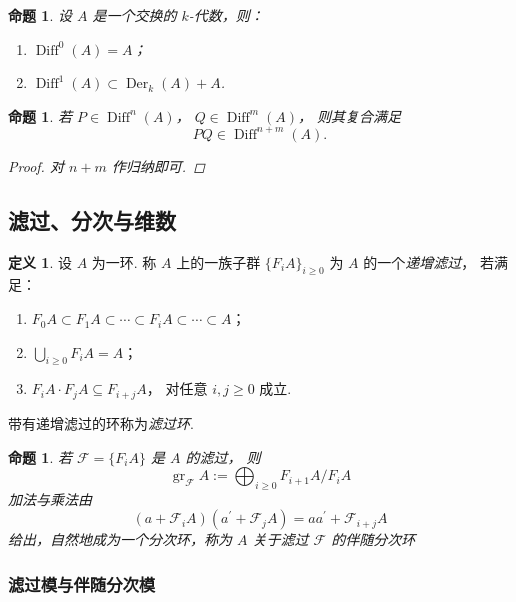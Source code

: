\documentclass[11pt]{article}
\theoremstyle{plain}
\newtheorem{proposition}[theorem]{命题}
\theoremstyle{definition}
\newtheorem{definition}[theorem]{定义}
\theoremstyle{remark}
\newcommand{\gr}{\operatorname{gr}}
\newcommand{\Der}{\operatorname{Der}}
\begin{document}
\begin{proposition}
    设 $A$ 是一个交换的 $k$-代数，则：
    \begin{enumerate}[label=(\arabic*)]
        \item $\operatorname{Diff}^0(A)=A$；
        \item $\operatorname{Diff}^1(A)\subset \Der_k(A)+A$.
    \end{enumerate}
\end{proposition}

\begin{proposition}
    若 $P \in \operatorname{Diff}^n(A)$，
    $Q \in \operatorname{Diff}^m(A)$，
    则其复合满足
    \[
        PQ \in \operatorname{Diff}^{n+m}(A).
    \]
    \begin{proof}
        对 $n+m$ 作归纳即可.
    \end{proof}
\end{proposition}



\subsection{滤过、分次与维数}
\begin{definition}
    设 $A$ 为一环.
    称 $A$ 上的一族子群 $\{F_iA\}_{i\ge0}$ 为
    $A$ 的一个\emph{递增滤过}，
    若满足：
    \begin{enumerate}
        \item
              $F_0A\subset F_1A\subset \cdots \subset F_iA\subset\cdots\subset A$；
        \item
              $\bigcup_{i\ge0}F_iA=A$；
        \item
              $F_iA\cdot F_jA\subseteq F_{i+j}A$，
              对任意 $i,j\ge0$ 成立.
    \end{enumerate}
    带有递增滤过的环称为\emph{滤过环}.
\end{definition}

\begin{proposition}
    若 $\mathcal{F}=\{F_iA\}$ 是 $A$ 的滤过，
    则
    \[
        \gr_{\mathcal{F}}A
        :=
        \bigoplus_{i\ge0}F_{i+1}A/F_iA
    \]
    加法与乘法由 \[
        (a+\mathcal{F}_iA)(a^\prime+\mathcal{F}_jA)
        =
        aa^\prime+\mathcal{F}_{i+j}A
    \]
    给出，自然地成为一个分次环，称为 $A$ 关于滤过 $\mathcal{F}$ 的\emph{伴随分次环}
\end{proposition}

\subsubsection{滤过模与伴随分次模}
\end{document}

